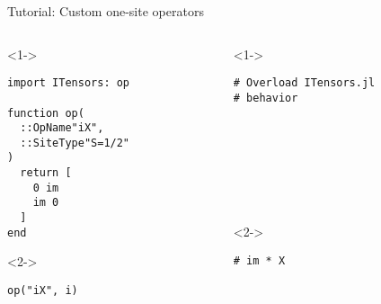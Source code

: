 \begin{frame}[fragile]{Tutorial: Custom one-site operators}

\begin{columns}

\begin{column}{4.5cm}

\begin{onlyenv}<1->

\begin{lstlisting}[language=JuliaLocal, style=julia, basicstyle=\small]
import ITensors: op

function op(
  ::OpName"iX",
  ::SiteType"S=1/2"
)
  return [
    0 im
    im 0
  ]
end
\end{lstlisting}

\end{onlyenv}

\begin{onlyenv}<2->

\begin{lstlisting}[language=JuliaLocal, style=julia, basicstyle=\small]
op("iX", i)
\end{lstlisting}

\end{onlyenv}

\end{column}

\begin{column}{4.5cm}

\begin{onlyenv}<1->

\begin{lstlisting}[style=julia, numbers=none, mathescape, basicstyle=\small]
# Overload ITensors.jl
# behavior








 \end{lstlisting}

\end{onlyenv}

\begin{onlyenv}<2->

\begin{lstlisting}[style=julia, numbers=none, mathescape, basicstyle=\small]
# im * X
\end{lstlisting}

\end{onlyenv}

\end{column}

\end{columns}

\end{frame}
